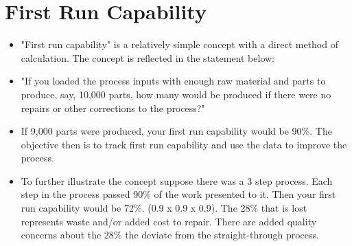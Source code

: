 \documentclass[11pt]{article} %
\begin{document}
\section{First Run Capability}
\begin{itemize}
\item "First run capability" is a relatively simple concept with a direct method of calculation. The concept is reflected in the statement below:

\item "If you loaded the process inputs with enough raw material and parts to produce, say, 10,000 parts, how many would be produced if there were no repairs or other corrections to the process?"

\item If 9,000 parts were produced, your first run capability would be 90\%. The objective then is to track first run capability and use the data to improve the process.

\item To further illustrate the concept suppose there was a 3 step process. Each step in the process passed 90\% of the work presented to it. Then your first run capability would be 72\%. (0.9 x 0.9 x 0.9). The 28\% that is lost represents waste and/or added cost to repair. There are added quality concerns about the 28\% the deviate from the straight-through process.
\end{itemize}
\end{document}
